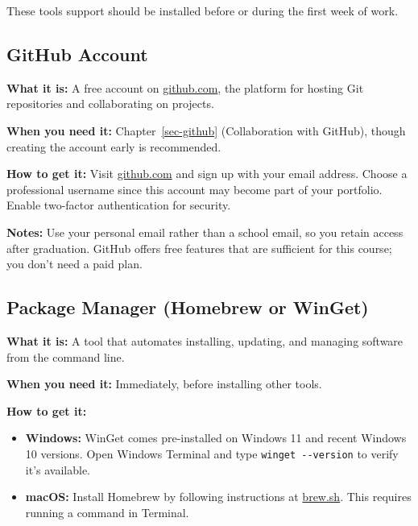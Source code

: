 \documentclass[
  letterpaper,
  DIV=11,
  numbers=noendperiod]{scrreprt}
\providecommand{\tightlist}{%
  \setlength{\itemsep}{0pt}\setlength{\parskip}{0pt}}
\begin{document}

These tools support should be installed before or during the first week
of work.

\subsection*{GitHub Account}\label{github-account}

\textbf{What it is:} A free account on
\href{https://github.com}{github.com}, the platform for hosting Git
repositories and collaborating on projects.

\textbf{When you need it:} Chapter~\ref{sec-github} (Collaboration with
GitHub), though creating the account early is recommended.

\textbf{How to get it:} Visit \href{https://github.com}{github.com} and
sign up with your email address. Choose a professional username since
this account may become part of your portfolio. Enable two-factor
authentication for security.

\textbf{Notes:} Use your personal email rather than a school email, so
you retain access after graduation. GitHub offers free features that are
sufficient for this course; you don't need a paid plan.

\subsection*{Package Manager (Homebrew or
WinGet)}\label{package-manager-homebrew-or-winget}

\textbf{What it is:} A tool that automates installing, updating, and
managing software from the command line.

\textbf{When you need it:} Immediately, before installing other tools.

\textbf{How to get it:}

\begin{itemize}
\tightlist
\item
  \textbf{Windows:} WinGet comes pre-installed on Windows 11 and recent
  Windows 10 versions. Open Windows Terminal and type
  \texttt{winget\ -\/-version} to verify it's available.
\item
  \textbf{macOS:} Install Homebrew by following instructions at
  \href{https://brew.sh}{brew.sh}. This requires running a command in
  Terminal.
\end{itemize}
\end{document}
